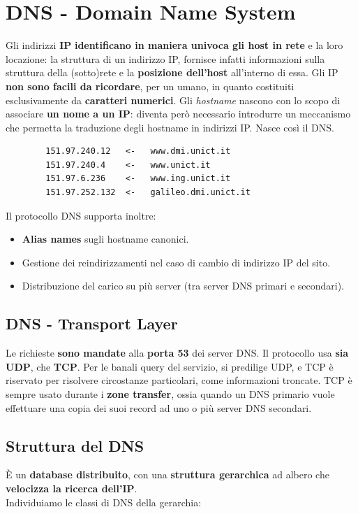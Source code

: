 \section{DNS - Domain Name System}
Gli indirizzi \textbf{IP} \textbf{identificano in maniera univoca gli host in rete} e la loro locazione: la struttura di un indirizzo IP, fornisce infatti informazioni sulla struttura della (sotto)rete e la \textbf{posizione dell'host} all'interno di essa. 
Gli IP \textbf{non sono facili da ricordare}, per un umano, in quanto costituiti esclusivamente da \textbf{caratteri numerici}. Gli \textit{hostname} nascono con lo scopo di associare \textbf{un nome a un IP}: diventa però necessario introdurre un meccanismo che permetta la traduzione degli hostname in indirizzi IP. Nasce così il DNS.
\begin{verbatim}
        151.97.240.12   <-   www.dmi.unict.it
        151.97.240.4    <-   www.unict.it
        151.97.6.236    <-   www.ing.unict.it
        151.97.252.132  <-   galileo.dmi.unict.it
\end{verbatim}

Il protocollo DNS supporta inoltre:
\begin{itemize}
    \item \textbf{Alias names} sugli hostname canonici. 
    \item Gestione dei reindirizzamenti nel caso di cambio di indirizzo IP del sito.
    \item Distribuzione del carico su più server (tra server DNS primari e secondari).
\end{itemize}

\subsection{DNS - Transport Layer}
Le richieste \textbf{sono mandate} alla \textbf{porta 53} dei server DNS. Il protocollo usa \textbf{sia UDP}, che \textbf{TCP}. Per le banali query del servizio, si predilige UDP, e TCP è riservato per risolvere circostanze particolari, come informazioni troncate.
TCP è sempre usato durante i \textbf{zone transfer}, ossia quando un DNS primario vuole effettuare una copia dei suoi record ad uno o più server DNS secondari.

\subsection{Struttura del DNS}
È un \textbf{database distribuito}, con una \textbf{struttura gerarchica} ad albero che \textbf{velocizza la ricerca dell'IP}.\\
Individuiamo le classi di DNS della gerarchia:

